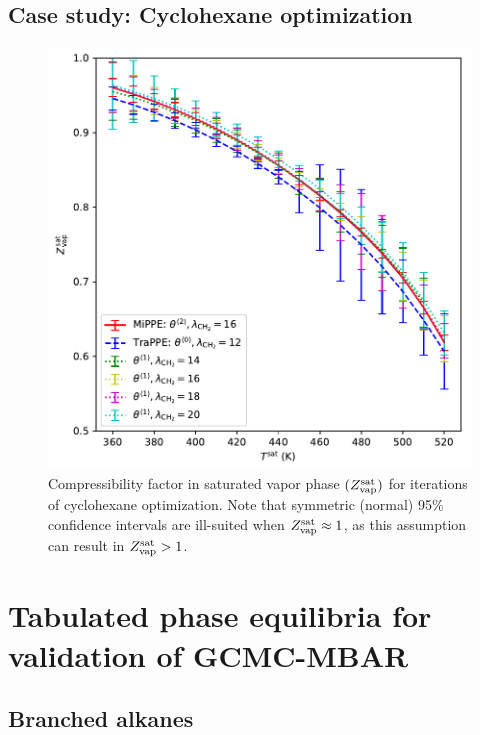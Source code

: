 \documentclass[journal=jctc,manuscript=article]{achemso}
\begin{document}
\newpage
\clearpage

\subsection{Case study: Cyclohexane optimization}

\begin{figure}[htb!]
	\centering
	\includegraphics[width=6.4in]{Compressibility_factor_CYC6_iterations.pdf}
	\caption{Compressibility factor in saturated vapor phase $(Z^{\rm sat}_{\rm vap})$ for iterations of cyclohexane optimization. Note that symmetric (normal) 95\% confidence intervals are ill-suited when $Z^{\rm sat}_{\rm vap} \approx 1$, as this assumption can result in $Z^{\rm sat}_{\rm vap} > 1$.}
	\label{SI fig:Z_CYC6}
\end{figure}

\newpage
\clearpage


\section{Tabulated phase equilibria for validation of GCMC-MBAR} \label{SI sec: Tabulated MBAR results}

\subsection{Branched alkanes}
\end{document}

